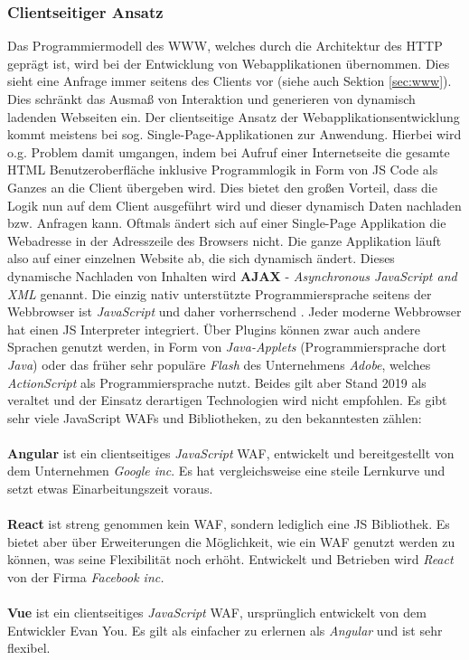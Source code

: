 \subsubsection{Clientseitiger Ansatz}\label{sec:clientseitigeransatz}
 Das Programmiermodell des WWW, welches durch die Architektur des HTTP geprägt ist, wird bei der Entwicklung von Webapplikationen übernommen. Dies sieht eine Anfrage immer seitens des Clients vor (siehe auch Sektion \ref{sec:www}). Dies schränkt das Ausmaß von Interaktion und generieren von dynamisch ladenden Webseiten ein. 
 Der clientseitige Ansatz der Webapplikationsentwicklung kommt meistens bei sog. Single-Page-Applikationen zur Anwendung. Hierbei wird o.g. Problem damit umgangen, indem bei Aufruf einer Internetseite die gesamte HTML Benutzeroberfläche inklusive Programmlogik in Form von JS Code als Ganzes an die Client übergeben wird. Dies bietet den großen Vorteil, dass die Logik nun auf dem Client ausgeführt wird und dieser dynamisch Daten nachladen bzw. Anfragen kann. Oftmals ändert sich auf einer Single-Page Applikation die Webadresse in der Adresszeile des Browsers nicht. Die ganze Applikation läuft also auf einer einzelnen Website ab, die sich dynamisch ändert. Dieses dynamische Nachladen von Inhalten wird \textbf{AJAX} - \emph{Asynchronous JavaScript and XML} genannt.  Die einzig nativ unterstützte Programmiersprache seitens der Webbrowser ist \emph{JavaScript} und daher vorherrschend \cite{Safran2011}.
 Jeder moderne Webbrowser hat einen JS Interpreter integriert. Über Plugins können zwar auch andere Sprachen genutzt werden, in Form von \emph{Java-Applets} (Programmiersprache dort \emph{Java}) oder das früher sehr populäre \emph{Flash} des Unternehmens \emph{Adobe}, welches \emph{ActionScript} als Programmiersprache nutzt. Beides gilt aber Stand 2019 als veraltet und der Einsatz derartigen Technologien wird nicht empfohlen. %
Es gibt sehr viele JavaScript WAFs und Bibliotheken, zu den bekanntesten zählen: \\ \\ 
 \textbf{Angular} ist ein clientseitiges \emph{JavaScript} WAF, entwickelt und bereitgestellt von dem Unternehmen \emph{Google inc}. Es hat vergleichsweise eine steile Lernkurve und setzt etwas Einarbeitungszeit voraus. \\ \\
 \textbf{React} ist streng genommen kein WAF, sondern lediglich eine JS Bibliothek. Es bietet aber über Erweiterungen die Möglichkeit, wie ein WAF genutzt werden zu können, was seine Flexibilität noch erhöht. Entwickelt und Betrieben wird \emph{React} von der Firma \emph{Facebook inc.} \\ \\
 \textbf{Vue} ist ein clientseitiges \emph{JavaScript} WAF, ursprünglich entwickelt von dem Entwickler Evan You. Es gilt als einfacher zu erlernen als \emph{Angular} und ist sehr flexibel. \\ 
 
